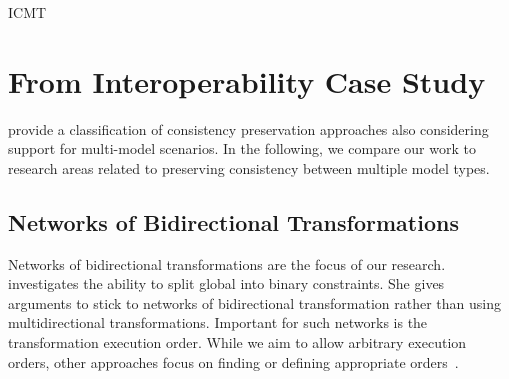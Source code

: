 \begin{copiedFrom}{ICMT}

\section{From Interoperability Case Study}

\textcite{macedo2017ModelRepairClassification-TSE} provide a classification of consistency preservation approaches also considering support for multi-model scenarios. %
In the following, we compare our work to research areas related to preserving consistency between multiple model types.

\subsection*{Networks of Bidirectional Transformations} 
Networks of bidirectional transformations are the focus of our research.
\textcite{stevens2020BidirectionalTransformationLarge-SoSym} investigates the ability to split global into binary constraints.
She gives arguments to stick to networks of bidirectional transformation rather than using multidirectional transformations. %
Important for such networks is the transformation execution order. 
While we aim to allow arbitrary execution orders, other approaches focus on finding or defining appropriate orders~\cite{stevens2020BuildingFromMegamodels-SoSym}.



\end{copiedFrom}
